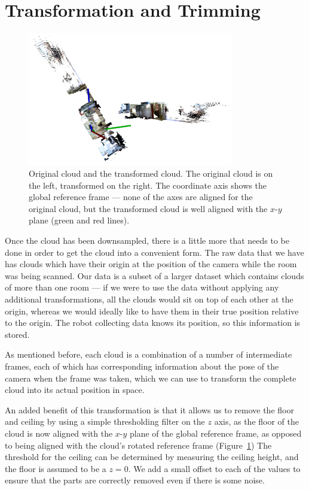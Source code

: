\documentclass[11pt,a4paper]{kth-mag}
\begin{document}
\section{Transformation and Trimming}
\begin{figure}[t]
  \centering
  \includegraphics[width=0.8\textwidth]{images/orig_transformed}
  \caption{Original cloud and the transformed cloud. The original cloud is on
    the left, transformed on the right. The coordinate axis shows the global
    reference frame --- none of the axes are aligned for the original cloud, but
    the transformed cloud is well aligned with the $x$-$y$ plane (green and red lines).}
  \label{fig:orig_transformed}
\end{figure}

Once the cloud has been downsampled, there is a little more that needs to be
done in order to get the cloud into a convenient form. The raw data that we have
has clouds which have their origin at the position of the camera while the room
was being scanned. Our data is a subset of a larger dataset which contains
clouds of more than one room --- if we were to use the data without applying any
additional transformations, all the clouds would sit on top of each other at the
origin, whereas we would ideally like to have them in their true position
relative to the origin. The robot collecting data knows its position, so this
information is stored.

As mentioned before, each cloud is a combination of a number of intermediate
frames, each of which has corresponding information about the pose of the camera
when the frame was taken, which we can use to transform the complete cloud into
its actual position in space.

An added benefit of this transformation is that it allows us to remove the floor
and ceiling by using a simple thresholding filter on the $z$ axis, as the floor
of the cloud is now aligned with the $x$-$y$ plane of the global reference
frame, as opposed to being aligned with the cloud's rotated reference frame
(Figure~\ref{fig:orig_transformed}) The threshold for the ceiling can be
determined by measuring the ceiling height, and the floor is assumed to be a
$z=0$. We add a small offset to each of the values to ensure that the parts are
correctly removed even if there is some noise.
\end{document}
